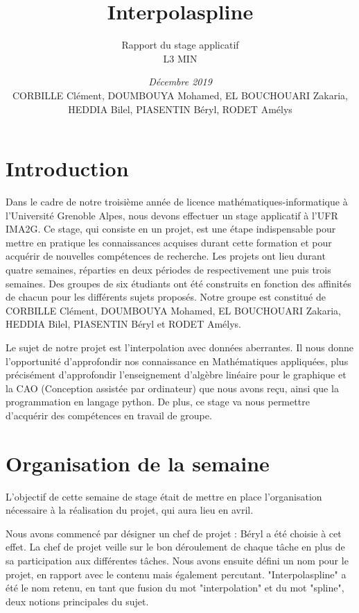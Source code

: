 \documentclass[a4paper,10pt]{article} %
\title{\textbf{Interpolaspline}}
\author{Rapport du stage applicatif\\ L3 MIN}
\date{\emph{Décembre 2019}\\CORBILLE Clément, DOUMBOUYA Mohamed, EL BOUCHOUARI Zakaria, HEDDIA Bilel, PIASENTIN Béryl, RODET Amélys}
\begin{document}

\maketitle %
\tableofcontents %

\newpage

\section*{Introduction}
Dans le cadre de notre troisième année de licence mathématiques-informatique à l’Université Grenoble Alpes, nous devons effectuer un stage applicatif à l’UFR IMA2G. Ce stage, qui consiste en un projet, est une étape indispensable pour mettre en pratique les connaissances acquises durant cette formation et pour acquérir de nouvelles compétences de recherche. Les projets ont lieu durant quatre semaines, réparties en deux périodes de respectivement une puis trois semaines. Des groupes de six étudiants ont été construits en fonction des affinités de chacun pour les différents sujets proposés. Notre groupe est constitué de CORBILLE Clément, DOUMBOUYA Mohamed, EL BOUCHOUARI Zakaria, HEDDIA Bilel, PIASENTIN Béryl et RODET Amélys.

Le sujet de notre projet est l'interpolation avec données aberrantes. Il nous donne l’opportunité d’approfondir nos connaissance en Mathématiques appliquées, plus précisément d'approfondir l'enseignement d'algèbre linéaire pour le graphique et la CAO (Conception assistée par ordinateur) que nous avons reçu, ainsi que la programmation en langage  python. De plus, ce stage va nous permettre d'acquérir des compétences en travail de groupe.

\section{Organisation de la semaine}

L'objectif de cette semaine de stage était de mettre en place l'organisation nécessaire à la réalisation du projet, qui aura lieu en avril.

Nous avons commencé par désigner un chef de projet : Béryl a été choisie à cet effet. La chef de projet veille sur le bon déroulement de chaque tâche en plus de sa participation aux différentes tâches. Nous avons ensuite défini un nom pour le projet, en rapport avec le contenu mais également percutant. "Interpolaspline" a été le nom retenu, en tant que fusion du mot "interpolation" et du mot "spline", deux notions principales du sujet.
\end{document}
